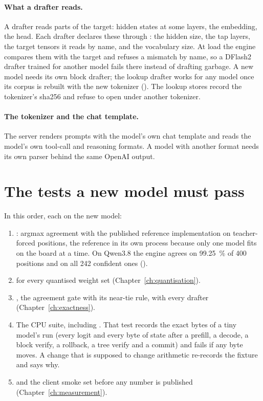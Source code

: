 \paragraph{What a drafter reads.} A drafter reads parts of the target: hidden states at some layers, the embedding, the head. Each drafter declares these through : the hidden size, the tap layers, the target tensors it reads by name, and the vocabulary size. At load the engine compares them with the target and refuses a mismatch by name, so a DFlash2 drafter trained for another model fails there instead of drafting garbage. A new model needs its own block drafter; the lookup drafter works for any model once its corpus is rebuilt with the new tokenizer (). The lookup stores record the tokenizer's sha256 and refuse to open under another tokenizer.

\paragraph{The tokenizer and the chat template.} The server renders prompts with the model's own chat template and reads the model's own tool-call and reasoning formats. A model with another format needs its own parser behind the same OpenAI output.

\section{The tests a new model must pass}

In this order, each on the new model:

\begin{enumerate}
\item {}: argmax agreement with the published reference implementation on teacher-forced positions, the reference in its own process because only one model fits on the board at a time. On Qwen3.8 the engine agrees on 99.25~\% of 400 positions and on all 242 confident ones (\measured).
\item {} for every quantised weight set (Chapter~\ref{ch:quantisation}).
\item {}, the agreement gate with its near-tie rule, with every drafter (Chapter~\ref{ch:exactness}).
\item The CPU suite, including . That test records the exact bytes of a tiny model's run (every logit and every byte of state after a prefill, a decode, a block verify, a rollback, a tree verify and a commit) and fails if any byte moves. A change that is supposed to change arithmetic re-records the fixture and says why.
\item {} and the client smoke set before any number is published (Chapter~\ref{ch:measurement}).
\end{enumerate}

